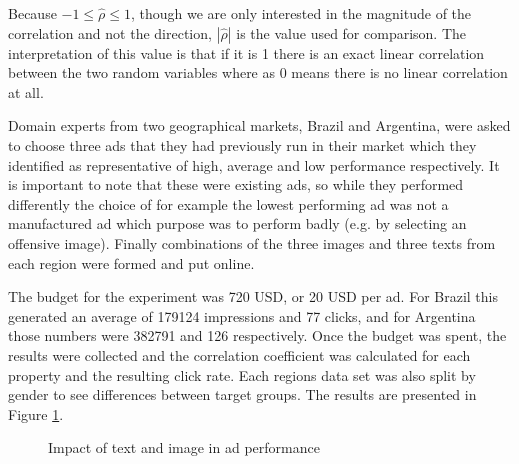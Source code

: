 \documentclass{sig-alternate}
\begin{document}
Because \(-1 \leq \hat{\rho} \leq 1 \), though we are only interested in the magnitude of the correlation and not the direction, \(|\hat{\rho}|\) is the value used for comparison. The interpretation of this value is that if it is 1 there is an exact linear correlation between the two random variables where as 0 means there is no linear correlation at all.

Domain experts from two geographical markets, Brazil and Argentina, were asked to choose three ads that they had previously run in their market which they identified as representative of high, average and low performance respectively. It is important to note that these were existing ads, so while they performed differently the choice of for example the lowest performing ad was not a manufactured ad which purpose was to perform badly (e.g. by selecting an offensive image). Finally combinations of the three images and three texts from each region were formed and put online.

The budget for the experiment was 720 USD, or 20 USD per ad. For Brazil this generated an average of 179124 impressions and 77 clicks, and for Argentina those numbers were 382791 and 126 respectively. Once the budget was spent, the results were collected and the correlation coefficient was calculated for each property and the resulting click rate. Each regions data set was also split by gender to see differences between target groups. The results are presented in Figure \ref{fig:PropertyImpact}.

\begin{figure}[htbp]
\begin{center}

	\caption{Impact of text and image in ad performance}
	\label{fig:PropertyImpact}
\end{center}
\end{figure}
\end{document}

